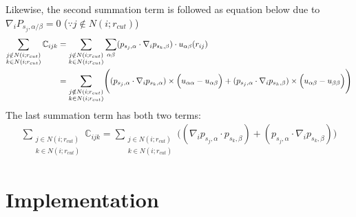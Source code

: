 \documentclass[11pt, oneside]{article}   	%
\begin{document}
Likewise, the second summation term is followed as equation below due to $\nabla_i P_{s_j, \alpha/\beta} = 0 $ ($\because j \notin N(i;r_{cut})$)
\begin{align}
 \sum_{\substack{j \notin N(i;r_{cut}) \\ k \in N(i;r_{cut})}} \mathbb{C}_{ijk} &=\sum_{\substack{j \notin N(i;r_{cut}) \\ k \in N(i;r_{cut})}} \sum_{\alpha\beta} (p_{s_j,\alpha} \cdot \nabla_i  p_{s_k,\beta}) \cdot u_{\alpha \beta} (r_{ij}) \\
& =   \sum_{\substack{j \notin N(i;r_{cut}) \\ k \in N(i;r_{cut})}}   \Biggl(  (p_{s_j,\alpha} \cdot \nabla_i p_{s_k,\alpha}) \times \Bigl(u_{\alpha \alpha}-u_{\alpha \beta}\Bigr) +  (p_{s_j,\alpha} \cdot \nabla_i p_{s_k,\beta}) \times \Bigl(u_{\alpha \beta} -u_{\beta \beta}\Bigr) \Biggr) \notag 
\end{align}
The last summation term has both two terms:
\begin{align}
 \sum_{\substack{j \in N(i;r_{cut}) \\ k \in N(i;r_{cut})}} \mathbb{C}_{ijk} = \sum_{\substack{j \in N(i;r_{cut}) \\ k \in N(i;r_{cut})}} \Biggl( (\nabla_i p_{s_j,\alpha} \cdot p_{s_k,\beta}) + (p_{s_j,\alpha} \cdot \nabla_i p_{s_k,\beta}) \Biggr)
 \end{align}
 \section{Implementation}
\end{document}
